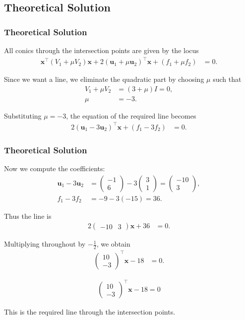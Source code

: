 \documentclass{beamer}
\theoremstyle{remark}
\newcommand{\myvec}[1]{\ensuremath{\begin{pmatrix}#1\end{pmatrix}}}
\let\vec\mathbf
\numberwithin{equation}{section}
\begin{document}
\subsection{Theoretical Solution }
\begin{frame}
\frametitle{Theoretical Solution}
All conics through the intersection points are given by the locus
\begin{align}
\vec{x}^\top (V_1+\mu V_2)\vec{x}
+2(\vec{u}_1+\mu\vec{u}_2)^\top\vec{x}
+(f_1+\mu f_2) &= 0.
\end{align}

Since we want a line, we eliminate the quadratic part by choosing $\mu$ such that
\begin{align}
V_1+\mu V_2 &= (3+\mu)I = 0, \\
\mu &= -3.
\end{align}

Substituting $\mu=-3$, the equation of the required line becomes
\begin{align}
2(\vec{u}_1-3\vec{u}_2)^\top \vec{x} + (f_1-3f_2) &= 0.
\end{align}

\end{frame}

\begin{frame}
\frametitle{Theoretical Solution}
Now we compute the coefficients:
\begin{align}
\vec{u}_1-3\vec{u}_2 &= \myvec{-1\\6} - 3\myvec{3\\1} = \myvec{-10\\3}, \\
f_1-3f_2 &= -9 - 3(-15) = 36.
\end{align}

Thus the line is
\begin{align}
2\myvec{-10 & 3}\vec{x} + 36 &= 0.
\end{align}

Multiplying throughout by $-\tfrac{1}{2}$, we obtain
\begin{align}
\myvec{10\\-3}^\top \vec{x} - 18 &= 0.
\end{align}

\begin{align}
\boxed{\myvec{10\\-3}^\top \vec{x} - 18 = 0}
\end{align}

This is the required line through the intersection points.


\end{frame}
\end{document}
